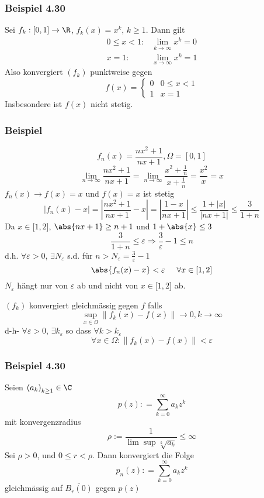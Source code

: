 \subsubsection*{Beispiel 4.30}
Sei $f_k:\lbrack 0,1\rbrack\to\R$, $f_k(x)=x^k$, $k\geq 1$. Dann gilt 
\begin{align*}
0 \le x < 1:&\mathop {\lim }\limits_{k \to \infty } {x^k} = 0\\
x = 1:&\mathop {\lim }\limits_{x \to \infty } {x^k} = 1
\end{align*}
Also konvergiert $\left( f_k\right)$ punktweise gegen 
\[f(x) = \left\{ {\begin{array}{*{20}{r}}
0&{0 \le x < 1}\\
1&{x = 1}
\end{array}} \right.\]
Insbesondere ist $f\left( x\right)$ nicht stetig.

\subsubsection*{Beispiel}
\[{f_n}\left( x \right) = \frac{{n{x^2} + 1}}{{nx + 1}},\Omega  = \left[ {0,1} \right]\]
\[\mathop {\lim }\limits_{n \to \infty } \frac{{n{x^2} + 1}}{{nx + 1}} = \mathop {\lim }\limits_{n \to \infty } \frac{{{x^2} + \frac{1}{n}}}{{x + \frac{1}{n}}} = \frac{{{x^2}}}{x} = x\]
$f_n(x)\to f(x)=x$ und $f(x)=x$ ist stetig
\[\left| {{f_n}(x) - x} \right| = \left| {\frac{{n{x^2} + 1}}{{nx + 1}} - x} \right| = \left| {\frac{{1 - x}}{{nx + 1}}} \right| \le \frac{{1 + \left| x \right|}}{{\left| {nx + 1} \right|}} \le \frac{3}{{1 + n}}\]
Da $x\in\lbrack 1,2\rbrack$, $\abs{nx+1}\geq n+1$ und $1+\abs{x}\leq 3$
\[\frac{3}{{1 + n}} \le \varepsilon  \Rightarrow \frac{3}{\varepsilon } - 1 \le n\]
d.h. $\forall\varepsilon>0$, $\exists N_\varepsilon$ s.d. für $n>N_{\varepsilon}=\frac{3}{\varepsilon}-1$
\[\abs{f_n(x)-x}<\varepsilon\hspace{5mm}\forall x\in\lbrack 1,2\rbrack\]
$N_\varepsilon$ hängt nur von $\varepsilon$ ab und nicht von $x\in\lbrack 1,2\rbrack$ ab.

\begin{definition}{4.29}
$\left( f_k\right)$ konvergiert gleichmässig gegen $f$ falls 
\[\mathop {\sup }\limits_{x \in \Omega } \left\| {{f_k}(x) - f(x)} \right\| \to 0,k \to \infty \]
d-h- $\forall\varepsilon>0$, $\exists k_\varepsilon$ so dass $\forall k>k_\varepsilon$
\[\forall x \in \Omega :\left\| {{f_k}(x) - f(x)} \right\| < \varepsilon \]
\end{definition}

\subsubsection*{Beispiel 4.30}
Seien $\left( a_k\right)_{k\geq 1}\in\C$\[p(z): = \sum\limits_{k = 0}^\infty  {{a_k}{z^k}} \]
mit konvergenzradius
\[\rho:=\frac{1}{\lim\sup\sqrt[k]{a_k}}\leq\infty\]
Sei $\rho>0$, und $0\leq r<\rho$. Dann konvergiert die Folge 
\[p_n(z): = \sum\limits_{k = 0}^\infty  {{a_k}{z^k}} \]
gleichmässig auf $\overline{B_r(0)}$ gegen $p(z)$ 

